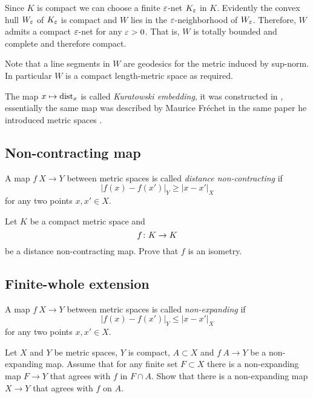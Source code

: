 Since $K$ is compact we can choose a finite $\varepsilon$-net $K_\varepsilon$ in $K$.
Evidently the convex hull $W_\varepsilon$ of $K_\varepsilon$ is compact and $W$ lies in the $\varepsilon$-neighborhood of $W_\varepsilon$.
Therefore, $W$ admits a compact $\varepsilon$-net for any $\varepsilon>0$.
That is, $W$ is totally bounded and complete and therefore compact.

Note that a line segments in $W$ are geodesics for the metric induced by sup-norm. 
In particular $W$ is a compact length-metric space as required.
\qeds

The map $x\mapsto \operatorname{\rm dist}\nolimits_x$ is called \emph{Kuratowski embedding},
it was constructed in \cite{kuratowski},
essentially the same map 
was described by Maurice Fr\'echet 
in the same paper he introduced metric spaces \cite[see][]{frechet}.


\subsection*{Non-contracting map\easy}
\label{Noncontracting map}

A map $f\: X\to Y$ between metric spaces is called \emph{distance non-contracting} if
\[|f(x)-f(x')|_Y\ge |x-x'|_X\]
for any two points $x,x'\in X$.

\begin{pr}
Let $K$  be a compact metric space and
\[f\:K\z\to K\] 
be a distance non-contracting map.
Prove that $f$ is an isometry.
\end{pr}

\subsection*{Finite-whole extension}
\label{Finite-whole extension}

A map $f\: X\to Y$ between metric spaces is called \emph{non-expanding} if
\[|f(x)-f(x')|_Y\le |x-x'|_X\]
for any two points $x,x'\in X$.

\begin{pr}
Let $X$ and $Y$ be metric spaces, 
$Y$ is compact,
$A\subset X$ and $f\:A\to Y$ be a non-expanding map.
Assume that for any finite set $F\subset X$ there is a non-expanding map $F \to Y$
that agrees with $f$ in $F\cap A$.
Show that there is a non-expanding map $X\to  Y$ that agrees with $f$ on $A$.
\end{pr}


